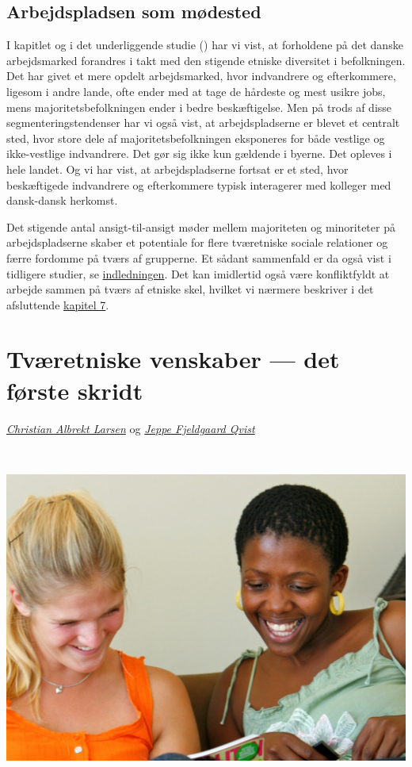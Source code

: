 \documentclass[
]{book}
\begin{document}
\section{Arbejdspladsen som mødested}\label{arbejdspladsen-som-muxf8dested}

I kapitlet og i det underliggende studie () har vi vist, at forholdene på det danske arbejdsmarked forandres i takt med den stigende etniske diversitet i befolkningen. Det har givet et mere opdelt arbejdsmarked, hvor indvandrere og efterkommere, ligesom i andre lande, ofte ender med at tage de hårdeste og mest usikre jobs, mens majoritetsbefolkningen ender i bedre beskæftigelse. Men på trods af disse segmenteringstendenser har vi også vist, at arbejdspladserne er blevet et centralt sted, hvor store dele af majoritetsbefolkningen eksponeres for både vestlige og ikke-vestlige indvandrere. Det gør sig ikke kun gældende i byerne. Det opleves i hele landet. Og vi har vist, at arbejdspladserne fortsat er et sted, hvor beskæftigede indvandrere og efterkommere typisk interagerer med kolleger med dansk-dansk herkomst.

Det stigende antal ansigt-til-ansigt møder mellem majoriteten og minoriteter på arbejdspladserne skaber et potentiale for flere tværetniske sociale relationer og færre fordomme på tværs af grupperne. Et sådant sammenfald er da også vist i tidligere studier, se \hyperref[indledning]{indledningen}. Det kan imidlertid også være konfliktfyldt at arbejde sammen på tværs af etniske skel, hvilket vi nærmere beskriver i det afsluttende \hyperref[kap7]{kapitel 7}.

\newpage
\thispagestyle{empty}

\chapter{Tværetniske venskaber --- det første skridt}\label{kap6}

\thispagestyle{empty}

\emph{\href{https://vbn.aau.dk/en/persons/albrekt}{Christian Albrekt Larsen}} og \emph{\href{https://vbn.aau.dk/da/persons/jeppefl}{Jeppe Fjeldgaard Qvist}}

~~~~

\includegraphics[width=1\linewidth]{images/kap71}
\end{document}
